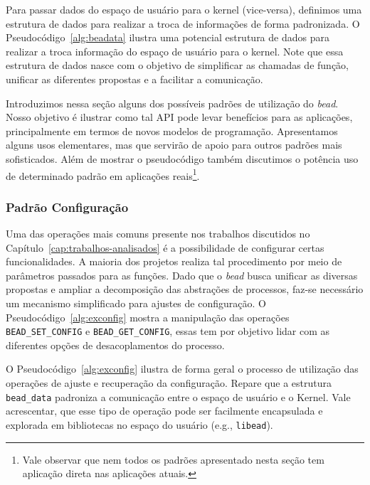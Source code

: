 

Para passar dados do espaço de usuário para o kernel (vice-versa), definimos
uma estrutura de dados para realizar a troca de informações de forma
padronizada. O Pseudocódigo~\ref{alg:beadata} ilustra uma potencial estrutura
de dados para realizar a troca informação do espaço de usuário para o kernel.
Note que essa estrutura de dados nasce com o objetivo de simplificar as
chamadas de função, unificar as diferentes propostas e a facilitar a
comunicação.



Introduzimos nessa seção alguns dos possíveis padrões de utilização do
\emph{bead}. Nosso objetivo é ilustrar como tal API pode levar benefícios para
as aplicações, principalmente em termos de novos modelos de programação.
Apresentamos alguns usos elementares, mas que servirão de apoio para outros
padrões mais sofisticados. Além de mostrar o pseudocódigo também discutimos o
potência uso de determinado padrão em aplicações reais\footnote{Vale observar
que nem todos os padrões apresentado nesta seção tem aplicação direta nas
aplicações atuais.}.

\subsubsection{Padrão Configuração}

Uma das operações mais comuns presente nos trabalhos discutidos no
Capítulo~\ref{cap:trabalhos-analisados} é a possibilidade de configurar certas
funcionalidades. A maioria dos projetos realiza tal procedimento por meio de
parâmetros passados para as funções. Dado que o \emph{bead} busca unificar as
diversas propostas e ampliar a decomposição das abstrações de processos, faz-se
necessário um mecanismo simplificado para ajustes de configuração. O
Pseudocódigo~\ref{alg:exconfig} mostra a manipulação das operações
\texttt{BEAD\_SET\_CONFIG} e \texttt{BEAD\_GET\_CONFIG}, essas tem por objetivo
lidar com as diferentes opções de desacoplamentos do processo.



O Pseudocódigo~\ref{alg:exconfig} ilustra de forma geral o processo de
utilização das operações de ajuste e recuperação da configuração. Repare que a
estrutura \texttt{bead\_data} padroniza a comunicação entre o espaço de usuário
e o Kernel. Vale acrescentar, que esse tipo de operação pode ser facilmente
encapsulada e explorada em bibliotecas no espaço do usuário (e.g.,
\texttt{libead}).

